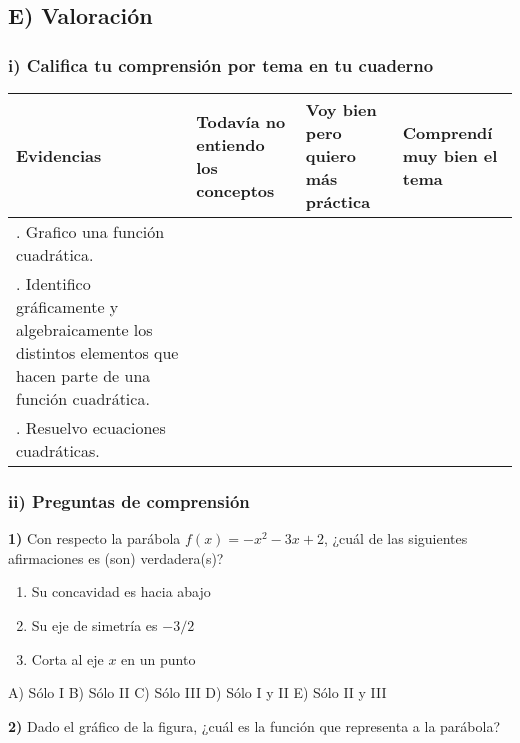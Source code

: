 \documentclass[12pt,a4paper]{article}
\begin{document}
\vspace{5mm}


\subsection*{E) Valoración}

\subsubsection*{i) Califica tu comprensión por tema en tu cuaderno}

\begin{center}
\small
\begin{tabular}{|
		>{\centering\arraybackslash}m{3.5cm}|
		>{\centering\arraybackslash}m{3cm}|
		>{\centering\arraybackslash}m{3cm}|
		>{\centering\arraybackslash}m{3cm}|}
\hline
\centering\textbf{Evidencias} & \centering\textbf{Todavía no entiendo los conceptos} & \centering\textbf{Voy bien pero quiero más práctica} & \textbf{Comprendí muy bien el tema} \\
\hline
1. Grafico una función cuadrática. & & & \\
\hline
2. Identifico gráficamente y algebraicamente los distintos elementos que hacen parte de una función cuadrática. & & & \\
\hline
3. Resuelvo ecuaciones cuadráticas. & & & \\
\hline
\end{tabular}
\end{center}

\subsubsection*{ii) Preguntas de comprensión}

\textbf{1)} Con respecto la parábola $f(x) = -x^2 - 3x + 2$, ¿cuál de las siguientes afirmaciones es (son) verdadera(s)?

\begin{enumerate}[label=\Roman*)]
\item Su concavidad es hacia abajo
\item Su eje de simetría es $-3/2$
\item Corta al eje $x$ en un punto
\end{enumerate}

A) Sólo I \quad B) Sólo II \quad C) Sólo III \quad D) Sólo I y II \quad E) Sólo II y III

\textbf{2)} Dado el gráfico de la figura, ¿cuál es la función que representa a la parábola?
\end{document}
